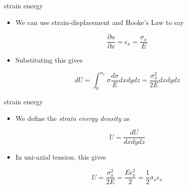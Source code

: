 \documentclass[
  letterpaper,
  ignorenonframetext,
  aspectratio=43,
  handout,
  12pt]{beamer}
\providecommand{\tightlist}{%
  \setlength{\itemsep}{0pt}\setlength{\parskip}{0pt}}
\providecommand{\tightlist}{%
\setlength{\itemsep}{0pt}\setlength{\parskip}{0pt}}
\begin{document}
\begin{frame}{strain energy}
\protect\hypertarget{strain-energy-4}{}
\begin{itemize}
\tightlist
\item
  We can use strain-displacement and Hooke's Law to say
\end{itemize}

\[\frac{\partial u}{\partial x} = \epsilon_x = \frac{\sigma_x}{E}\]

\begin{itemize}
\tightlist
\item
  Substituting this gives
\end{itemize}

\[dU = \int_0^{\sigma_x} \sigma \frac{d \sigma}{E}dxdydz = \frac{\sigma_x^2}{2E} dx dy dz\]
\end{frame}

\begin{frame}{strain energy}
\protect\hypertarget{strain-energy-5}{}
\begin{itemize}
\tightlist
\item
  We define the \emph{strain energy density} as
\end{itemize}

\[U = \frac{dU}{dx dy dz}\]

\begin{itemize}
\tightlist
\item
  In uni-axial tension, this gives
\end{itemize}

\[U = \frac{\sigma_x^2}{2E} = \frac{E \epsilon_x^2}{2} = \frac{1}{2}\sigma_x \epsilon_x\]
\end{frame}
\end{document}
